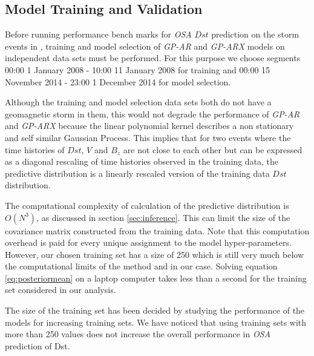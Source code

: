 \documentclass[referee,a4paper,12pt,traditabstract]{swsc}
\begin{document}
\begin{linenumbers}
\section{Model Training and Validation}

Before running performance bench marks for \emph{OSA} $Dst$ prediction on the storm events in \cite{Ji2012}, training and model selection of \emph{GP-AR} and \emph{GP-ARX} models on independent data sets must be performed. For this purpose we choose segments 00:00 1 January 2008 - 10:00 11 January 2008 for training and 00:00 15 November 2014 - 23:00 1 December 2014 for model selection. 

Although the training and model selection data sets both do not have a geomagnetic storm in them, this would not degrade the performance of \emph{GP-AR} and \emph{GP-ARX} because the linear polynomial kernel describes a non stationary and self similar Gaussian Process. This implies that for two events where the time histories of $Dst$, $V$ and $B_z$ are not close to each other but can be expressed as a diagonal rescaling of time histories observed in the training data, the predictive distribution is a linearly rescaled version of the training data $Dst$ distribution. 

The computational complexity of calculation of the predictive distribution is $O(N^3)$, as discussed in section \ref{sec:inference}. This can limit the size of the covariance matrix constructed from the training data. Note that this computation overhead is paid for every unique assignment to the model hyper-parameters. However, our chosen training set has a size of 250 which is still very much below the computational limits of the method and in our case. Solving equation \ref{eq:posteriormean} on a laptop computer takes less than a second for the training set considered in our analysis. 

The size of the training set has been decided by studying the performance of the models for increasing training sets. We have noticed that using training sets with more than 250 values does not increase the overall performance in \emph{OSA} prediction of Dst. 



\end{linenumbers}
\end{document}
